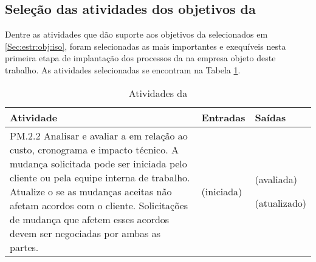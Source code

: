 \subsection{Seleção das atividades dos objetivos da \iso}

Dentre as atividades que dão suporte aos objetivos da \iso selecionados em \ref{Sec:estr:obj:iso}, foram selecionadas as mais importantes e exequíveis nesta primeira etapa de implantação dos processos da \iso na empresa objeto deste trabalho. As atividades selecionadas se encontram na Tabela \ref{Tab:estrat:ativ:iso}.

\begin{table}[h!]\footnotesize
\centering
\begin{tabular}
{
 	|p{7cm}
 	|p{}
 	|p{}|
}

\hline

	\textbf{Atividade \iso}&
	\textbf{Entradas}&
	\textbf{Saídas}\\
	\hline
	
	PM.2.2 Analisar e avaliar a \muda em relação ao custo, cronograma e impacto técnico. A mudança solicitada pode ser iniciada pelo cliente ou pela equipe interna de trabalho. Atualize o \ppj se as mudanças aceitas não afetam acordos com o cliente. Solicitações de mudança que afetem esses acordos devem ser negociadas por ambas as partes.&
	\muda (iniciada)\par\ppj&
	\muda (avaliada)\par\ppj (atualizado)\\
	\hline
	
\end{tabular}
\caption{Atividades da \iso}
\label{Tab:estrat:ativ:iso}
\end{table}



